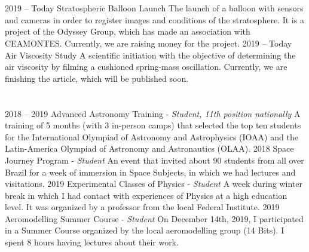 \documentclass{cv}
\begin{document}
    \section*{}
        \begin{entrylist}
            \entry
                {2019 -- Today}
                {Stratospheric Balloon Launch}
                {}
                {The launch of a balloon with sensors and cameras in order to register images and conditions of the stratosphere. It is a project of the Odyssey Group, which has made an association with CEAMONTES. Currently, we are raising money for the project.}
            \entry
                {2019 -- Today}
                {Air Viscosity Study}
                {}
                {A scientific initiation with the objective of determining the air viscosity by filming a cushioned spring-mass oscillation. Currently, we are finishing the article, which will be published soon.}
        \end{entrylist}
    
    \section*{}
        \begin{entrylist}
            \entry
                {2018 -- 2019}
                {Advanced Astronomy Training - {\textit{Student, 11th position nationally}}}
                {}
                {A training of 5 months (with 3 in-person camps) that selected the top ten students for the International Olympiad of Astronomy and Astrophysics (IOAA) and the Latin-America Olympiad of Astronomy and Astronautics (OLAA).}
            \entry
                {2018}
                {Space Journey Program - {\textit{Student}}}
                {}
                {An event that invited about 90 students from all over Brazil for a week of immersion in Space Subjects, in which we had lectures and visitations.}
            \entry
                {2019}
                {Experimental Classes of Physics - {\textit{Student}}}
                {}
                {A week during winter break in which I had contact with experiences of Physics at a high education level. It was organized by a professor from the local Federal Institute.}
            \entry
                {2019}
                {Aeromodelling Summer Course - {\textit{Student}}}
                {}
                {On December 14th, 2019, I participated in a Summer Course organized by the local aeromodelling group (14 Bits). I spent 8 hours having lectures about their work.}
        \end{entrylist}
    
\end{document}
